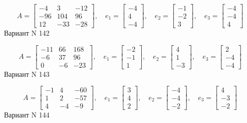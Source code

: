 \documentclass[11pt]{report}
\begin{document}
$$A = \left[\begin{matrix}-4 & 3 & -12\\-96 & 104 & 96\\12 & -33 & -28\end{matrix}\right],\quad e_1 = \left[\begin{matrix}-4\\4\\-4\end{matrix}\right],\quad e_2 = \left[\begin{matrix}-1\\-2\\3\end{matrix}\right],\quad e_3 = \left[\begin{matrix}-4\\-4\\4\end{matrix}\right]$$Вариант N 142

$$A = \left[\begin{matrix}-11 & 66 & 168\\-6 & 37 & 96\\0 & -6 & -23\end{matrix}\right],\quad e_1 = \left[\begin{matrix}-2\\-1\\1\end{matrix}\right],\quad e_2 = \left[\begin{matrix}4\\1\\-3\end{matrix}\right],\quad e_3 = \left[\begin{matrix}2\\-4\\-4\end{matrix}\right]$$Вариант N 143

$$A = \left[\begin{matrix}-1 & 4 & -60\\1 & 2 & -57\\4 & -4 & -9\end{matrix}\right],\quad e_1 = \left[\begin{matrix}3\\4\\2\end{matrix}\right],\quad e_2 = \left[\begin{matrix}-4\\-4\\-2\end{matrix}\right],\quad e_3 = \left[\begin{matrix}4\\-3\\-2\end{matrix}\right]$$Вариант N 144
\end{document}
